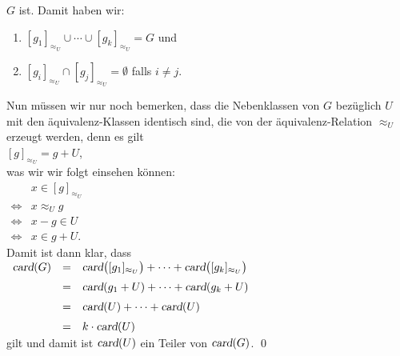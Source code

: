 $G$ ist.  Damit haben wir:
\begin{enumerate}
\item $[g_1]_{\approx_U} \cup \cdots \cup [g_k]_{\approx_U} = G$ \quad und
\item $[g_i]_{\approx_U} \cap [g_j]_{\approx_U} = \emptyset$ \quad falls $i \not= j$.
\end{enumerate}
Nun m\"{u}ssen wir nur noch bemerken, dass die Nebenklassen von $G$ bez\"{u}glich $U$ mit den
\"{a}quivalenz-Klassen identisch sind, die von der \"{a}quivalenz-Relation $\approx_U$ erzeugt werden, denn
es gilt
\\[0.2cm]
\hspace*{1.3cm}
$[g]_{\approx_U} = g + U$,
\\[0.2cm] 
was wir wir folgt einsehen k\"{o}nnen:
\\[0.2cm]
\hspace*{1.3cm}
$
\begin{array}{cl}
                & x \in [g]_{\approx_U}  \\[0.2cm]
\Leftrightarrow & x \approx_U g        \\[0.2cm]
\Leftrightarrow & x - g \in U          \\[0.2cm] 
\Leftrightarrow & x \in g + U.
\end{array}
$
\\[0.2cm]
Damit ist dann klar, dass
\\[0.2cm]
\hspace*{1.3cm}
$
\begin{array}{lcl}
  \textsl{card}(G) & = & \textsl{card}\bigl([g_1]_{\approx_U}\bigr) + \cdots + \textsl{card}\bigl([g_k]_{\approx_U}\bigr) 
                         \\[0.2cm]
                   & = & \textsl{card}(g_1 + U) + \cdots + \textsl{card}(g_k + U) \\[0.2cm]
                   & = & \textsl{card}(U) + \cdots + \textsl{card}(U) \\[0.2cm]
                   & = & k \cdot \textsl{card}(U)
\end{array}
$
\\[0.2cm]
gilt und damit ist $\textsl{card}(U)$ ein Teiler von $\textsl{card}(G)$.  \qed

